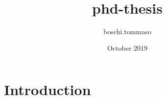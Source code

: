 \documentclass{article}
\title{phd-thesis}
\author{boschi.tommaso }
\date{October 2019}
\begin{document}
\maketitle

\section{Introduction}
\end{document}
